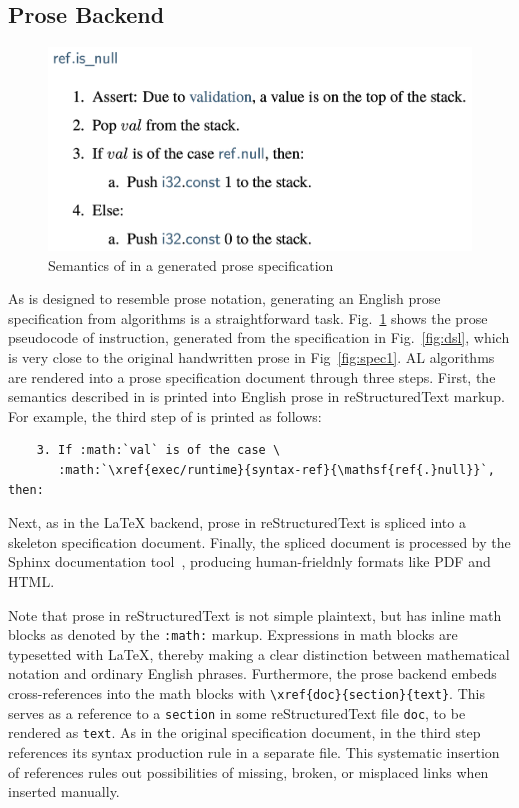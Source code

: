 \subsection{Prose Backend}\label{sec:prose} %
\begin{figure}[t]
\centering
\includegraphics[width=.5\textwidth]{../img/genprose}
\vspace*{-1em}
\caption{Semantics of  in a generated prose specification}
\label{fig:genprose}
\end{figure}

As \al is designed to resemble prose notation, 
generating an English prose specification from \al algorithms is a straightforward task.
Fig.~\ref{fig:genprose} shows the prose pseudocode of  instruction,
generated from the specification in Fig.~\ref{fig:dsl},
which is very close to the original handwritten prose in Fig~\ref{fig:spec1}.
AL algorithms are rendered into a prose specification document through three steps.
First, the semantics described in \al is printed into English prose in reStructuredText markup.
For example, the third step of  is printed as follows:
\begin{verbatim}
    3. If :math:`val` is of the case \
       :math:`\xref{exec/runtime}{syntax-ref}{\mathsf{ref{.}null}}`, then:
\end{verbatim}
Next, as in the LaTeX backend, prose in reStructuredText is spliced into a skeleton specification document.
Finally, the spliced document is processed by the Sphinx documentation tool~\cite{sphinx},
producing human-frieldnly formats like PDF and HTML.

Note that prose in reStructuredText is not simple plaintext,
but has inline math blocks as denoted by the \texttt{:math:} markup.
Expressions in math blocks are typesetted with LaTeX, thereby
making a clear distinction between mathematical notation and ordinary English phrases.
Furthermore, the prose backend embeds cross-references into the math blocks 
with \texttt{\textbackslash xref\{doc\}\{section\}\{text\}}.
This serves as a reference to a \texttt{section}
in some reStructuredText file \texttt{doc}, to be rendered as \texttt{text}.
As in the original specification document, 
 in the third step references its syntax production rule in a separate file.
This systematic insertion of references rules out
possibilities of missing, broken, or misplaced links when inserted manually.
